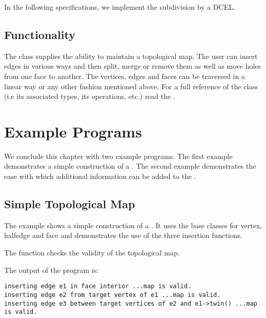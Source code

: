 In the following
specifications, we implement the subdivision by a DCEL. 

\subsection*{Functionality}

The class  supplies the ability to maintain
a topological map. The user can insert edges in various ways and then split,
merge or remove them as well as move holes from one face to another.
The vertices, edges and faces can be traversed in a 
linear way or any other fashion mentioned above.
For a full reference of the class (i.e its associated types,
its operations, etc.) read the .


\section{Example Programs}
\label{TPM_sec:example}
We conclude this chapter with two example programs. The first example
demonstrates a simple construction of a . The 
second example demonstrates the ease with which additional information can
be added to the .

\subsection{Simple Topological Map}
The example shows a simple construction of a .
It uses the base classes for vertex, halfedge and face and demonstrates
the use of the three insertion functions.

The function  checks the validity of the topological map.


The output of the program is:

\begin{verbatim}
inserting edge e1 in face interior ...map is valid.
inserting edge e2 from target vertex of e1 ...map is valid.
inserting edge e3 between target vertices of e2 and e1->twin() ...map is valid.

\end{verbatim}

